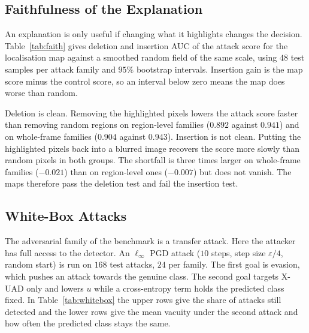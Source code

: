 \documentclass[conference]{IEEEtran}
\newcommand{\sub}[1]{\subsection{\texorpdfstring{\textbf{#1}}{#1}}}
\newlength{\colw}
\begin{document}
\begin{table}[t]
\centering
\caption{Localisation IoU (\%)}
\label{tab:loc}
\scriptsize
\resizebox{\colw}{!}{}
\end{table}

\sub{Faithfulness of the Explanation}
An explanation is only useful if changing what it highlights changes the decision.
Table~\ref{tab:faith} gives deletion and insertion AUC \cite{petsiuk2018rise} of the
attack score for the localisation map against a smoothed random field of the same
scale, using $48$ test samples per attack family and $95\%$ bootstrap intervals.
Insertion gain is the map score minus the control score, so an interval below zero
means the map does worse than random.

\begin{table}[t]
\centering
\caption{Faithfulness of the map}
\label{tab:faith}
\scriptsize
\resizebox{\colw}{!}{}
\end{table}

Deletion is clean. Removing the highlighted pixels lowers the attack score faster
than removing random regions on region-level families ($0.892$ against $0.941$) and
on whole-frame families ($0.904$ against $0.943$). Insertion is not clean. Putting the
highlighted pixels back into a blurred image recovers the score more slowly than
random pixels in both groups. The shortfall is three times larger on whole-frame
families ($-0.021$) than on region-level ones ($-0.007$) but does not vanish. The maps
therefore pass the deletion test and fail the insertion test.

\sub{White-Box Attacks}
The adversarial family of the benchmark is a transfer attack. Here the attacker has
full access to the detector. An $\ell_\infty$ PGD attack \cite{madry2018pgd} ($10$
steps, step size $\varepsilon/4$, random start) is run on $168$ test attacks, $24$
per family. The first goal is evasion, which pushes an attack towards the genuine
class. The second goal targets X-UAD only and lowers $u$ while a cross-entropy term
holds the predicted class fixed. In Table~\ref{tab:whitebox} the upper rows give the
share of attacks still detected and the lower rows give the mean vacuity under the
second attack and how often the predicted class stays the same.

\begin{table}[t]
\centering
\caption{White-box PGD results}
\label{tab:whitebox}
\scriptsize
\resizebox{\colw}{!}{}
\end{table}
\end{document}
